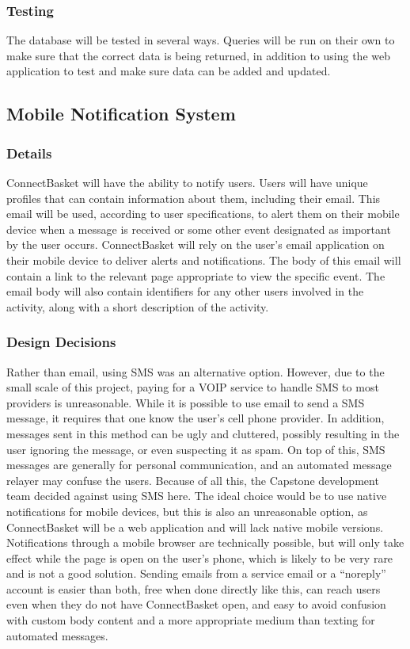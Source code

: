 \documentclass[onecolumn, draftclsnofoot,10pt, compsoc]{IEEEtran}
\begin{document}
\subsubsection{Testing}
The database will be tested in several ways. Queries will be run on their own to make sure that the correct data is being returned, in addition to using the web application to test and make sure data can be added and updated.

\subsection{Mobile Notification System}

\subsubsection{Details}
ConnectBasket will have the ability to notify users. Users will have unique profiles that can contain information about them, including their email. This email will be used, according to user specifications, to alert them on their mobile device when a message is received or some other event designated as important by the user occurs. ConnectBasket will rely on the user's email application on their mobile device to deliver alerts and notifications. The body of this email will contain a link to the relevant page appropriate to view the specific event. The email body will also contain identifiers for any other users involved in the activity, along with a short description of the activity.


\subsubsection{Design Decisions}
Rather than email, using SMS was an alternative option. However, due to the small scale of this project, paying for a VOIP service to handle SMS to most providers is unreasonable. While it is possible to use email to send a SMS message, it requires that one know the user's cell phone provider. In addition, messages sent in this method can be ugly and cluttered, possibly resulting in the user ignoring the message, or even suspecting it as spam. On top of this, SMS messages are generally for personal communication, and an automated message relayer may confuse the users. Because of all this, the Capstone development team decided against using SMS here. The ideal choice would be to use native notifications for mobile devices, but this is also an unreasonable option, as ConnectBasket will be a web application and will lack native mobile versions. Notifications through a mobile browser are technically possible, but will only take effect while the page is open on the user’s phone, which is likely to be very rare and is not a good solution. Sending emails from a service email or a “noreply” account is easier than both, free when done directly like this, can reach users even when they do not have ConnectBasket open, and easy to avoid confusion with custom body content and a more appropriate medium than texting for automated messages.
\end{document}
